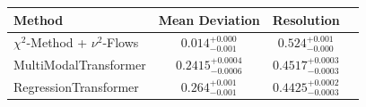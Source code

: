     \begin{tabular}{lccc}
        \toprule
        Method & Mean Deviation & Resolution \\
        \midrule
        $\chi^2$-Method + $\nu^2$-Flows & $0.014_{-0.001}^{+0.000}$ & $0.524_{-0.000}^{+0.001}$ \\
        MultiModalTransformer & $0.2415_{-0.0006}^{+0.0004}$ & $0.4517_{-0.0003}^{+0.0003}$ \\
        RegressionTransformer & $0.264_{-0.001}^{+0.001}$ & $0.4425_{-0.0003}^{+0.0002}$ \\
        \bottomrule
    \end{tabular}